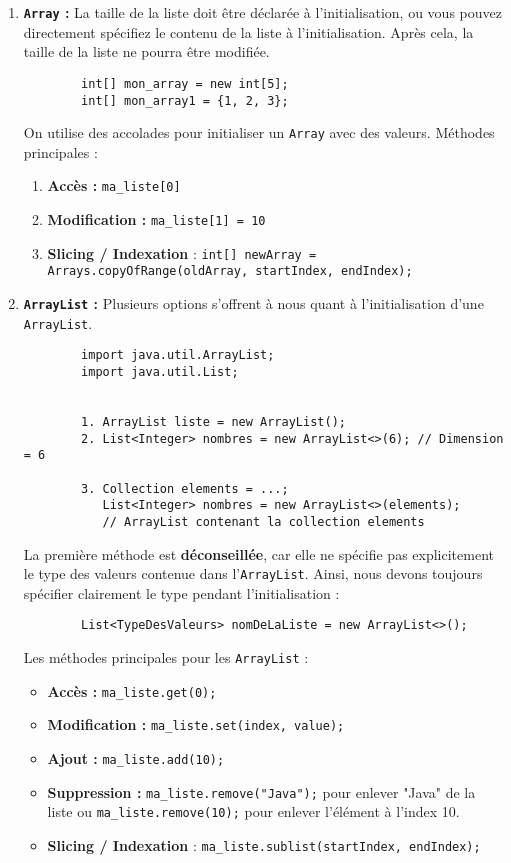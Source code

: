 \begin{enumerate}
    \item \textbf{\lstinline{Array} :} La taille de la liste doit être déclarée à l'initialisation, ou vous pouvez directement spécifiez le contenu de la liste à l'initialisation. Après cela, la taille de la liste ne pourra être modifiée.
    \begin{verbatim}
        int[] mon_array = new int[5];
        int[] mon_array1 = {1, 2, 3};
    \end{verbatim}
    On utilise des accolades pour initialiser un \lstinline{Array} avec des valeurs.
    Méthodes principales :
    \begin{enumerate}
        \item \textbf{Accès :} \lstinline{ma_liste[0]}
        \item \textbf{Modification :} \lstinline{ma_liste[1] = 10}
        \item \textbf{Slicing / Indexation} : \lstinline{int[] newArray = Arrays.copyOfRange(oldArray, startIndex, endIndex);} 
    \end{enumerate}
    
    
    \item \textbf{\lstinline{ArrayList} :} Plusieurs options s'offrent à nous quant à l'initialisation d'une \lstinline{ArrayList}.
    \begin{verbatim}
        import java.util.ArrayList;
        import java.util.List;
        
        
        1. ArrayList liste = new ArrayList();
        2. List<Integer> nombres = new ArrayList<>(6); // Dimension = 6
         
        3. Collection elements = ...;
           List<Integer> nombres = new ArrayList<>(elements); 
           // ArrayList contenant la collection elements
    \end{verbatim}
    La première méthode est \textbf{déconseillée}, car elle ne spécifie pas explicitement le type des valeurs contenue dans l'\lstinline{ArrayList}. Ainsi, nous devons toujours spécifier clairement le type pendant l'initialisation :
    \begin{verbatim}
        List<TypeDesValeurs> nomDeLaListe = new ArrayList<>();
    \end{verbatim}
    Les méthodes principales pour les \lstinline{ArrayList} :
    \begin{itemize}
        \item \textbf{Accès :} \lstinline{ma_liste.get(0);}
        \item \textbf{Modification :} \lstinline{ma_liste.set(index, value);}
        \item \textbf{Ajout :} \lstinline{ma_liste.add(10);}
        \item \textbf{Suppression :} \lstinline{ma_liste.remove("Java");} pour enlever "Java" de la liste ou \lstinline{ma_liste.remove(10);} pour enlever l'élément à l'index 10.
        \item \textbf{Slicing / Indexation} : \lstinline{ma_liste.sublist(startIndex, endIndex);} 
\end{itemize}
\end{enumerate}



